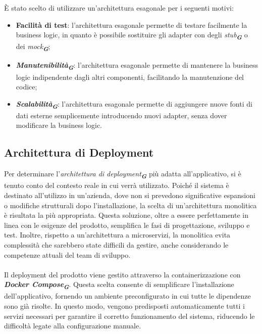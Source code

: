 È stato scelto di utilizzare un'architettura esagonale per i seguenti motivi:
\begin{itemize}
    \item \textbf{Facilità di test}: l'architettura esagonale permette di testare facilmente la business logic, in quanto è possibile sostituire gli adapter con degli \emph{stub}\textsubscript{\textbf{\textit{G}}} o dei \emph{mock}\textsubscript{\textbf{\textit{G}}};
    \item \textbf{\emph{Manutenibilità}}\textsubscript{\textbf{\textit{G}}}: l'architettura esagonale permette di mantenere la business logic indipendente dagli altri componenti, facilitando la manutenzione del codice;
    \item \textbf{\emph{Scalabilità}}\textsubscript{\textbf{\textit{G}}}: l'architettura esagonale permette di aggiungere nuove fonti di dati esterne semplicemente introducendo nuovi adapter, senza dover modificare la business logic.
\end{itemize}


\subsection{Architettura di Deployment}
\label{sec:architettura_deployment}

Per determinare l'\emph{architettura di deployment}\textsubscript{\textbf{\textit{G}}} più adatta all'applicativo, si è tenuto conto del contesto reale in cui verrà utilizzato. Poiché il sistema è destinato all'utilizzo in un'azienda, dove non si prevedono significative espansioni o modifiche strutturali dopo l'installazione, la scelta di un'architettura monolitica è risultata la più appropriata. Questa soluzione, oltre a essere perfettamente in linea con le esigenze del prodotto, semplifica le fasi di progettazione, sviluppo e test. Inoltre, rispetto a un'architettura a microservizi, la monolitica evita complessità che sarebbero state difficili da gestire, anche considerando le competenze attuali del team di sviluppo.\\\\
Il deployment del prodotto viene gestito attraverso la containerizzazione con \textbf{\emph{Docker Compose}}\textsubscript{\textbf{\textit{G}}}. Questa scelta consente di semplificare l’installazione dell’applicativo, fornendo un ambiente preconfigurato in cui tutte le dipendenze sono già risolte. In questo modo, vengono predisposti automaticamente tutti i servizi necessari per garantire il corretto funzionamento del sistema, riducendo le difficoltà legate alla configurazione manuale.


